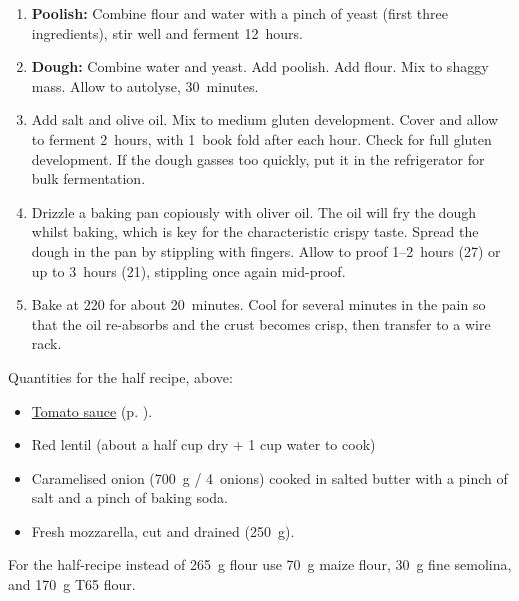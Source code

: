\begin{recipe}
  \begin{enumerate}

  \item \textbf{Poolish:} Combine flour and water with a pinch of
    yeast (first three ingredients), stir well and ferment 12~hours.

  \item \textbf{Dough:} Combine water and yeast.  Add poolish.  Add
    flour.  Mix to shaggy mass.  Allow to autolyse, 30~minutes.

  \item Add salt and olive oil.  Mix to medium gluten development.
    Cover and allow to ferment 2\fracH~hours, with 1~book fold after
    each hour.  Check for full gluten development.  If the dough
    gasses too quickly, put it in the refrigerator for bulk fermentation.

  \item Drizzle a baking pan copiously with oliver oil.  The oil will
    fry the dough whilst baking, which is key for the characteristic
    crispy taste.  Spread the dough in the pan by stippling with
    fingers.  Allow to proof 1\fracH--2~hours (27\degreeC) or up to
    3~hours (21\degreeC), stippling once again mid-proof.

  \item Bake at 220\degreeC{} for about 20~minutes.  Cool for several
    minutes in the pain so that the oil re-absorbs and the crust
    becomes crisp, then transfer to a wire rack.

  \end{enumerate}
\end{recipe}


Quantities for the half recipe, above:
\begin{itemize}
\item \hyperref[tomato.sauce]{Tomato sauce} (p. \pageref{tomato.sauce}).
\item Red lentil (about a half cup dry + 1 cup water to cook)
\item Caramelised onion (700~g / 4~onions) cooked in salted butter
  with a pinch of salt and a pinch of baking soda.
\item Fresh mozzarella, cut and drained (250~g).
\end{itemize}


For the half-recipe instead of 265~g flour use 70~g maize flour, 30~g
fine semolina, and 170~g T65 flour.
